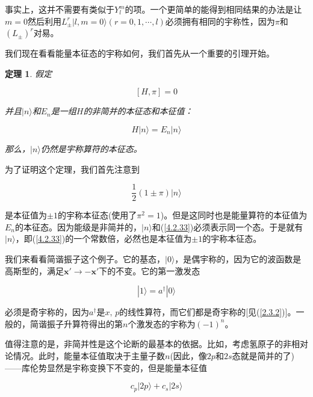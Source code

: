 \documentclass[UTF8,twoside]{ctexart}
\newtheorem{theo}{定理}[section]
\begin{document}
\noindent 事实上，这并不需要有类似于$Y_l^m$的项。一个更简单的能得到相同结果的办法是让$m=0$然后利用$L_{\pm}^r|l, m=0\rangle(r = 0, 1, \cdots, l)$必须拥有相同的宇称性，因为$\pi$和$(L_{\pm})^r$对易。

我们现在看看能量本征态的宇称如何，我们首先从一个重要的引理开始。

\begin{theo}
假定

\begin{equation}
\left[H, \pi\right] = 0
\end{equation}

\noindent 并且$|n\rangle$和$E_n$是一组$H$的非简并的本征态和本征值：

\begin{equation} \label{4.2.32}
H|n\rangle = E_n|n\rangle
\end{equation}

\noindent 那么，$|n\rangle$仍然是宇称算符的本征态。
\end{theo}

 为了证明这个定理，我们首先注意到

\begin{equation} \label{4.2.33}
\frac{1}{2}(1\pm\pi)|n\rangle
\end{equation}

是本征值为$\pm 1$的宇称本征态(使用了$\pi^2 = 1$)。但是这同时也是能量算符的本征值为$E_n$的本征态。因为能级是非简并的，$|n\rangle$和(\ref{4.2.33})必须表示同一个态。于是就有$|n\rangle$，即(\ref{4.2.33})的一个常数倍，必然也是本征值为$\pm 1$的宇称本征态。

我们来看看简谐振子这个例子。它的基态，$|0\rangle$，是偶宇称的，因为它的波函数是高斯型的，满足$\bm{x}'\rightarrow-\bm{x}'$下的不变。它的第一激发态

\begin{equation}
|1\rangle = a^{\dagger}|0\rangle
\end{equation}

\noindent 必须是奇宇称的，因为$a^{\dagger}$是$x,\, p$的线性算符，而它们都是奇宇称的[见(\ref{2.3.2})]。一般的，简谐振子升算符得出的第$n$个激发态的宇称为$(-1)^n$。

值得注意的是，非简并性是这个论断的最基本的依据。比如，考虑氢原子的非相对论情况。此时，能量本征值取决于主量子数$n$(因此，像$2p$和$2s$态就是简并的了)——库伦势显然是宇称变换下不变的，但是能量本征值

\begin{equation}
c_p|2p\rangle + c_s|2s\rangle
\end{equation}
\end{document}
